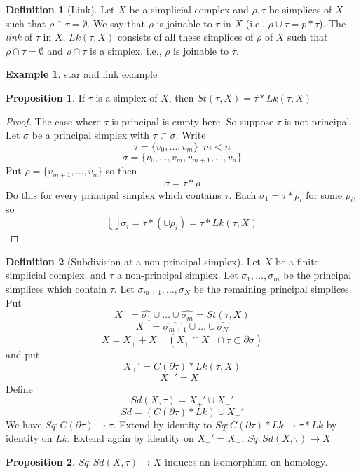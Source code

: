 \documentclass[a4paper,14pt]{extarticle}
\theoremstyle{definition}
\newtheorem*{definition}{Definition}
\newtheorem*{proposition}{Proposition}
\newtheorem*{eg}{Example}
\begin{document}
\begin{definition}[Link]
	Let $X$ be a simplicial complex and $\rho,\tau$ be simplices of $X$ such that 
	$\rho\cap\tau=\emptyset$. We say that $\rho$ is joinable to $\tau$ in $X$ (i.e.,
	$\rho\cup\tau=p*\tau$). The \emph{link} of $\tau$ in $X$, $Lk(\tau,X)$ consists of all
	these simplices of $\rho$ of $X$ such that $\rho\cap\tau=\emptyset$ and $\rho\cap\tau$ is
	a simplex, i.e., $\rho$ is joinable to $\tau$.
\end{definition}

\begin{eg}
	star and link example
\end{eg}

\begin{proposition}
	If $\tau$ is a simplex of $X$, then $St(\tau,X)=\hat{\tau}*Lk(\tau,X)$
\end{proposition}

\begin{proof}
	The case where $\tau$ is principal is empty here. So suppose $\tau$ is not principal.
	Let $\sigma$ be a principal simplex with $\tau\subset\sigma$. Write
	\[\tau=\{v_0,\ldots,v_m\} \,\,\,m<n\] \[\sigma=\{v_0,\ldots,v_m,v_{m+1},\ldots,v_n\}\]
	Put $\rho=\{v_{m+1},\ldots,v_n\}$ so then \[\sigma=\tau*\rho\] Do this for every principal
	simplex which contains $\tau$. Each $\sigma_1=\tau*\rho_i$ for some $\rho_i$, so 
	\[\bigcup\sigma_i=\tau*(\cup\rho_i)=\tau*Lk(\tau,X)\]
\end{proof}

\begin{definition}[Subdivision at a non-principal simplex]
	Let $X$ be a finite simplicial complex, and $\tau$ a non-principal simplex.
	Let $\sigma_1,\ldots,\sigma_m$ be the principal simplices which contain $\tau$.
	Let $\sigma_{m+1},\ldots,\sigma_N$ be the remaining principal simplices.
	Put \[X_+=\hat{\sigma_1}\cup\ldots\cup\hat{\sigma_m}=St(\tau,X)\]
	\[X_-=\hat{\sigma_{m+1}}\cup\ldots\cup\hat{\sigma_N}\]
	\[X=X_++X_- \,\,\,(X_+\cap X_-\cap\tau\subset \partial\sigma)\]
	and put 
	\[X_+'=C(\partial\tau)*Lk(\tau,X)\]
	\[X_-'=X_-\] Define \[Sd(X,\tau)=X_+'\cup X_-'\] \[Sd=(C(\partial\tau)*Lk)\cup X_-'\]
	We have $Sq:C(\partial\tau)\rightarrow\tau$. Extend by identity to 
	$Sq:C(\partial\tau)*Lk\rightarrow\tau*Lk$ by identity on $Lk$. Extend again by identity
	on $X_-'=X_-$, $Sq:Sd(X,\tau)\rightarrow X$
\end{definition}

\begin{proposition}
	$Sq:Sd(X,\tau)\rightarrow X$ induces an isomorphism on homology.
\end{proposition}
\end{document}
